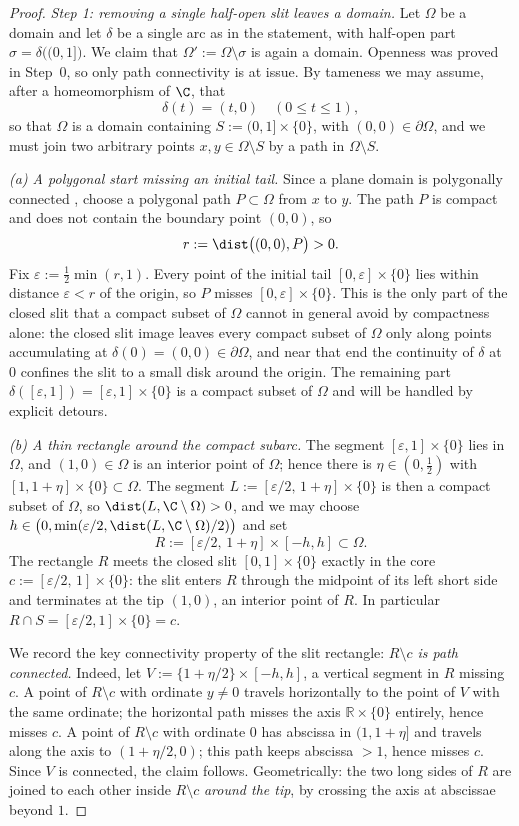 \begin{proof}
\emph{Step 1: removing a single half-open slit leaves a domain.}
Let $\Omega$ be a domain and let $\delta$ be a single arc as in the statement, with
half-open part $\sigma=\delta\bigl((0,1]\bigr)$. We claim that
$\Omega':=\Omega\setminus\sigma$ is again a domain. Openness was proved in Step~0, so
only path connectivity is at issue. By tameness we may assume, after a homeomorphism of
$\C$, that
\[
\delta(t)=(t,0)\quad(0\le t\le1),
\]
so that $\Omega$ is a domain containing $S:=(0,1]\times\{0\}$, with
$(0,0)\in\partial\Omega$, and we must join two arbitrary points
$x,y\in\Omega\setminus S$ by a path in $\Omega\setminus S$.

\emph{(a) A polygonal start missing an initial tail.}
Since a plane domain is polygonally connected \cite{New51}, choose a polygonal path
$P\subset\Omega$ from $x$ to $y$. The path $P$ is compact and does not contain the
boundary point $(0,0)$, so
\[
r:=\dist\bigl((0,0),P\bigr)>0 .
\]
Fix $\varepsilon:=\tfrac12\min(r,1)$. Every point of the initial tail
$[0,\varepsilon]\times\{0\}$ lies within distance $\varepsilon<r$ of the origin, so $P$
misses $[0,\varepsilon]\times\{0\}$. This is the only part of the closed slit that a
compact subset of $\Omega$ cannot in general avoid by compactness alone: the closed slit
image leaves every compact subset of $\Omega$ only along points accumulating at
$\delta(0)=(0,0)\in\partial\Omega$, and near that end the continuity of $\delta$ at $0$
confines the slit to a small disk around the origin. The remaining part
$\delta([\varepsilon,1])=[\varepsilon,1]\times\{0\}$ is a compact subset of $\Omega$ and
will be handled by explicit detours.

\emph{(b) A thin rectangle around the compact subarc.}
The segment $[\varepsilon,1]\times\{0\}$ lies in $\Omega$, and $(1,0)\in\Omega$ is an
interior point of $\Omega$; hence there is $\eta\in(0,\tfrac12)$ with
$[1,1+\eta]\times\{0\}\subset\Omega$. The segment
$L:=[\varepsilon/2,\,1+\eta]\times\{0\}$ is then a compact subset of $\Omega$, so
$\dist(L,\C\setminus\Omega)>0$, and we may choose
$h\in\bigl(0,\min(\varepsilon/2,\dist(L,\C\setminus\Omega)/2)\bigr)$ and set
\[
R:=[\varepsilon/2,\,1+\eta]\times[-h,h]\subset\Omega .
\]
The rectangle $R$ meets the closed slit $[0,1]\times\{0\}$ exactly in the core
$c:=[\varepsilon/2,\,1]\times\{0\}$: the slit enters $R$ through the midpoint of its
left short side and terminates at the tip $(1,0)$, an interior point of $R$. In
particular $R\cap S=[\varepsilon/2,1]\times\{0\}=c$.

We record the key connectivity property of the slit rectangle: \emph{$R\setminus c$ is
path connected.} Indeed, let $V:=\{1+\eta/2\}\times[-h,h]$, a vertical segment in $R$
missing $c$. A point of $R\setminus c$ with ordinate $y\neq0$ travels horizontally to
the point of $V$ with the same ordinate; the horizontal path misses the axis
$\mathbb{R}\times\{0\}$ entirely, hence misses $c$. A point of $R\setminus c$ with
ordinate $0$ has abscissa in $(1,1+\eta]$ and travels along the axis to $(1+\eta/2,0)$;
this path keeps abscissa $>1$, hence misses $c$. Since $V$ is connected, the claim
follows. Geometrically: the two long sides of $R$ are joined to each other inside
$R\setminus c$ \emph{around the tip}, by crossing the axis at abscissae beyond $1$.


\end{proof}
